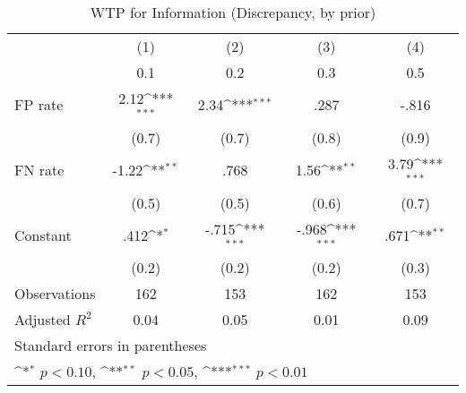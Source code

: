 \begin{table}[htbp]\centering
\def\sym#1{\ifmmode^{#1}\else\(^{#1}\)\fi}
\caption{WTP for Information (Discrepancy, by prior)}
\begin{tabular}{l*{4}{c}}
\hline\hline
                &\multicolumn{1}{c}{(1)}&\multicolumn{1}{c}{(2)}&\multicolumn{1}{c}{(3)}&\multicolumn{1}{c}{(4)}\\
                &\multicolumn{1}{c}{0.1}&\multicolumn{1}{c}{0.2}&\multicolumn{1}{c}{0.3}&\multicolumn{1}{c}{0.5}\\
\hline
FP rate         &     2.12\sym{***}&     2.34\sym{***}&     .287         &    -.816         \\
                &    (0.7)         &    (0.7)         &    (0.8)         &    (0.9)         \\
FN rate         &    -1.22\sym{**} &     .768         &     1.56\sym{**} &     3.79\sym{***}\\
                &    (0.5)         &    (0.5)         &    (0.6)         &    (0.7)         \\
Constant        &     .412\sym{*}  &    -.715\sym{***}&    -.968\sym{***}&     .671\sym{**} \\
                &    (0.2)         &    (0.2)         &    (0.2)         &    (0.3)         \\
\hline
Observations    &      162         &      153         &      162         &      153         \\
Adjusted \(R^{2}\)&     0.04         &     0.05         &     0.01         &     0.09         \\
\hline\hline
\multicolumn{5}{l}{\footnotesize Standard errors in parentheses}\\
\multicolumn{5}{l}{\footnotesize \sym{*} \(p<0.10\), \sym{**} \(p<0.05\), \sym{***} \(p<0.01\)}\\
\end{tabular}
\end{table}
